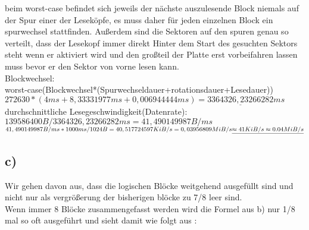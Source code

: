 \documentclass{ti2}
\begin{document}
beim worst-case befindet sich jeweils der nächste auszulesende Block niemals auf der Spur einer der Leseköpfe, es muss daher für jeden einzelnen Block ein spurwechsel stattfinden. Außerdem sind die Sektoren auf den spuren genau so verteilt, dass der Lesekopf immer direkt Hinter dem Start des gesuchten Sektors steht wenn er aktiviert wird und den großteil der Platte erst vorbeifahren lassen muss bevor er den Sektor von vorne lesen kann.\\

Blockwechsel:\\ worst-case(Blockwechsel*(Spurwechseldauer+rotationsdauer+Lesedauer))\\
$272630*(4ms+8,33331977ms+0,006944444ms)\underline{=3364326,23266282ms}$\\










durchschnittliche Lesegeschwindigkeit(Datenrate):\\
$139586400 B / 3364326,23266282ms = 41,490149987 B/ms$\\
$41,490149987 B/ms * 1000ms / 1024B = 40,517724597 KiB/s = 0,03956809 MiB/s\\ \underline{\approx 41 KiB/s \approx 0.04 MiB/s}$\\

\subsection*{c)}
Wir gehen davon aus, dass die logischen Blöcke weitgehend ausgefüllt sind und nicht nur als vergrößerung der bisherigen blöcke zu 7/8 leer sind.\\
Wenn immer 8 Blöcke zusammengefasst werden wird die Formel aus b) nur 1/8 mal so oft ausgeführt und sieht damit wie folgt aus :\\
\end{document}
